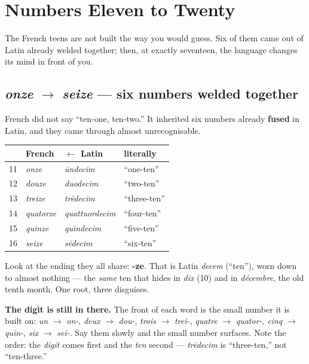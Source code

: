 \chapter{Numbers Eleven to Twenty}
\label{ch:numbers-11-20}

The French teens are not built the way you would guess. Six of them came out of
Latin already welded together; then, at exactly seventeen, the language changes
its mind in front of you.

\section[\emph{onze} to \emph{seize}]{\emph{onze} $\to$ \emph{seize} --- six numbers welded together}
\label{lesson:nombres-11-16}

French did not say ``ten-one, ten-two.'' It inherited six numbers already
\textbf{fused} in Latin, and they came through almost unrecognisable.

\begin{center}
\begin{tabular}{@{}llll@{}}
\toprule
& French & $\leftarrow$ Latin & literally \\
\midrule
11 & \emph{onze} & \emph{\=undecim} & ``one-ten'' \\
12 & \emph{douze} & \emph{duodecim} & ``two-ten'' \\
13 & \emph{treize} & \emph{tr\=edecim} & ``three-ten'' \\
14 & \emph{quatorze} & \emph{quattuordecim} & ``four-ten'' \\
15 & \emph{quinze} & \emph{qu\={\i}ndecim} & ``five-ten'' \\
16 & \emph{seize} & \emph{s\=edecim} & ``six-ten'' \\
\bottomrule
\end{tabular}
\end{center}

\begin{cousinweb}
Look at the ending they all share: \textbf{-ze}. That is Latin \emph{decem}
(``ten''), worn down to almost nothing --- the \emph{same} ten that hides in
\emph{dix} (10) and in \emph{d\'{e}cembre}, the old tenth month. One root,
three disguises.
\end{cousinweb}

\newpage
\begin{grammarlens}
\textbf{The digit is still in there.} The front of each word is the small
number it is built on: \emph{un} $\to$ \emph{on-}, \emph{deux} $\to$
\emph{dou-}, \emph{trois} $\to$ \emph{trei-}, \emph{quatre} $\to$
\emph{quator-}, \emph{cinq} $\to$ \emph{quin-}, \emph{six} $\to$ \emph{sei-}.
Say them slowly and the small number surfaces. Note the order: the \emph{digit}
comes first and the \emph{ten} second --- \emph{tr\=edecim} is ``three-ten,''
not ``ten-three.''
\end{grammarlens}

